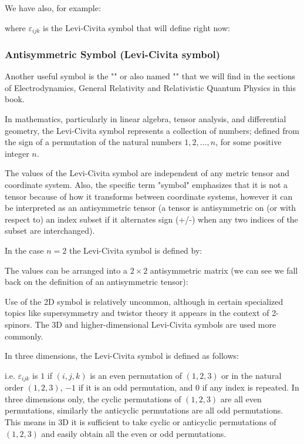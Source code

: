 	We have also, for example:
	
	where $\varepsilon_{ijk}$ is the Levi-Civita symbol that will define right now:
	
	\subsubsection{Antisymmetric Symbol (Levi-Civita symbol)}
	Another useful symbol is the "" or also named "" that we will find in the sections of Electrodynamics,  General Relativity and Relativistic Quantum Physics in this book.
	
	In mathematics, particularly in linear algebra, tensor analysis, and differential geometry, the Levi-Civita symbol represents a collection of numbers; defined from the sign of a permutation of the natural numbers $1, 2, …, n$, for some positive integer $n$.
	
		 The values of the Levi-Civita symbol are independent of any metric tensor and coordinate system. Also, the specific term "symbol" emphasizes that it is not a tensor because of how it transforms between coordinate systems, however it can be interpreted as an antisymmetric tensor (a tensor is antisymmetric on (or with respect to) an index subset if it alternates sign (+/-) when any two indices of the subset are interchanged).
	 
	 In the case $n=2$ the Levi-Civita symbol is defined by:
	 
	The values can be arranged into a $2\times 2$ antisymmetric matrix (we can see we fall back on the definition of an antisymmetric tensor):
	
	Use of the 2D symbol is relatively uncommon, although in certain specialized topics like supersymmetry and twistor theory it appears in the context of 2-spinors. The 3D and higher-dimensional Levi-Civita symbols are used more commonly.
	
	In three dimensions, the Levi-Civita symbol is defined as follows:
	
	i.e.  $\varepsilon_{ijk}$  is $1$ if $(i, j, k)$ is an even permutation of $(1,2,3)$ or in the natural order $(1,2,3)$, $-1$ if it is an odd permutation, and $0$ if any index is repeated. In three dimensions only, the cyclic permutations of $(1,2,3)$ are all even permutations, similarly the anticyclic permutations are all odd permutations. This means in 3D it is sufficient to take cyclic or anticyclic permutations of $(1,2,3)$ and easily obtain all the even or odd permutations.


